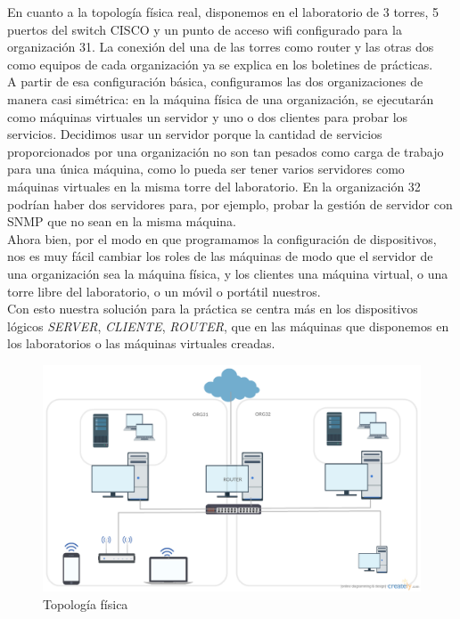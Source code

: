 \documentclass[]{article}
\begin{document}

En cuanto a la topología física real, disponemos en el laboratorio de 3 torres, 5 puertos del switch CISCO y un punto de acceso wifi configurado para la organización 31. La conexión del una de las torres como router y las otras dos como equipos de cada organización ya se explica en los boletines de prácticas.
\\

A partir de esa configuración básica, configuramos las dos organizaciones de manera casi simétrica: en la máquina física de una organización, se ejecutarán como máquinas virtuales un servidor y uno o dos clientes para probar los servicios. Decidimos usar un servidor porque la cantidad de servicios proporcionados por una organización no son tan pesados como carga de trabajo para una única máquina, como lo pueda ser tener varios servidores como máquinas virtuales en la misma torre del laboratorio. En la organización 32 podrían haber dos servidores para, por ejemplo, probar la gestión de servidor con SNMP que no sean en la misma máquina.
\\

Ahora bien, por el modo en que programamos la configuración de dispositivos, nos es muy fácil cambiar los roles de las máquinas de modo que el servidor de una organización sea la máquina física, y los clientes una máquina virtual, o una torre libre del laboratorio, o un móvil o portátil nuestros.
\\

Con esto nuestra solución para la práctica se centra más en los dispositivos lógicos \textit{SERVER}, \textit{CLIENTE}, \textit{ROUTER}, que en las máquinas que disponemos en los laboratorios o las máquinas virtuales creadas.


\begin{figure}[h!]
	\caption{Topología física}
	\centering
		\includegraphics[scale=0.35]{images/TopologiaFisica}
\end{figure}
\end{document}
